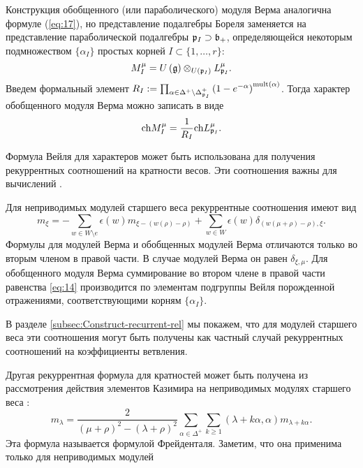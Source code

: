 Конструкция обобщенного (или параболического) модуля Верма аналогична формуле (\ref{eq:17}), но представление подалгебры Бореля заменяется на представление параболической подалгебры $\mathfrak{p}_{I}\supset \mathfrak{b}_{+}$, определяющейся некоторым подмножеством  $\{\alpha_{I}\}$ простых корней $I\subset \{1,\dots, r\}$:
\begin{equation*}
M_{I}^{\mu}=U\left( \mathfrak{g}\right)\otimes _{U\left( \mathfrak{p}_{I}\right) }L_{\mathfrak{p}_{I}}^{\mu}.
\end{equation*}
Введем формальный элемент $R_{I}:=\prod_{\alpha \in \Delta
^{+}\setminus \Delta _{\mathfrak{p}_{I}}^{+}}\left( 1-e^{-\alpha }\right)
^{\mathrm{mult}(\alpha )}$. Тогда характер обобщенного модуля Верма можно записать в виде
\begin{equation}
  \label{eq:18}
  \mathrm{ch}M_{I}^{\mu}=\frac{1}{R_{I}}\mathrm{ch}L_{\mathfrak{p}_{I}}^{\mu }.
\end{equation}


Формула Вейля для характеров может быть использована для получения рекуррентных соотношений на кратности весов. Эти соотношения важны для вычислений \cite{il2010folded,kulish4sfa}. 

Для неприводимых модулей старшего веса рекуррентные соотношения имеют вид
\begin{equation}
\label{eq:14}
m_{\xi }=-\sum_{w\in W\setminus e}\epsilon (w)m_{\xi
-\left( w(\rho )-\rho \right) }+\sum_{w\in W}\epsilon
(w)\delta _{\left( w(\mu +\rho )-\rho \right) ,\xi }.
\end{equation}
Формулы для модулей Верма и обобщенных модулей Верма отличаются только во вторым членом в правой части. В случае модулей Верма он равен $\delta_{\xi,\mu}$. Для обобщенного модуля Верма суммирование во втором члене в правой части равенства \eqref{eq:14} производится по элементам подгруппы Вейля порожденной отражениями, соответствующими корням $\{\alpha_{I}\}$.

В разделе \ref{subsec:Construct-recurrent-rel} мы покажем, что для модулей старшего веса эти соотношения могут быть получены как частный случай рекуррентных соотношений на коэффициенты ветвления.

Другая рекуррентная формула для кратностей может быть получена из рассмотрения действия элементов Казимира на неприводимых модулях старшего веса \cite{humphreys1997introduction}:
\begin{equation}
  \label{eq:15}
  m_{\lambda}=\frac{2}{(\mu+\rho)^{2}-(\lambda+\rho)^{2}}\sum_{\alpha\in \Delta^{+}}\sum_{k\geq 1} (\lambda+k\alpha,\alpha)m_{\lambda+k\alpha}.
\end{equation}
Эта формула называется формулой Фрейденталя. Заметим, что она применима только для неприводимых модулей

